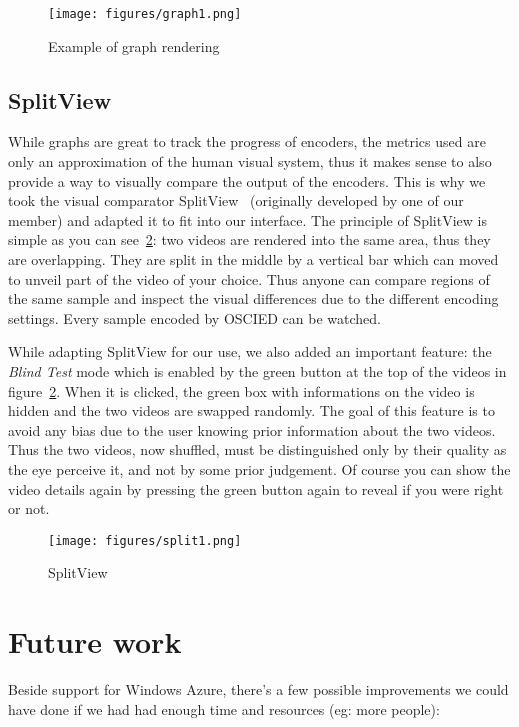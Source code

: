 \documentclass[a4paper,12pt]{article}
\begin{document}
\begin{figure}[!h] \centering
  \texttt{[image: figures/graph1.png]}
  \caption{Example of graph rendering}
  \label{fig:graph1}
\end{figure}

\subsection{SplitView}
While graphs are great to track the progress of encoders, the metrics used are
only an approximation of the human visual system, thus it makes sense to also
provide a way to visually compare the output of the encoders.
This is why we took the visual comparator SplitView~\cite{splitview}
(originally developed by one of our member) and adapted it to fit into our
interface.  The principle of SplitView is simple as you can
see~\ref{fig:split1}: two videos are rendered into the same area, thus they are
overlapping.  They are split in the middle by a vertical bar which can moved to
unveil part of the video of your choice.  Thus anyone can compare regions of the
same sample and inspect the visual differences due to the different encoding
settings. Every sample encoded by OSCIED can be watched.

While adapting SplitView for our use, we also added an important feature: the
\emph{Blind Test} mode which is enabled by the green button at the top of the
videos in figure~\ref{fig:split1}.  When it is clicked, the green box with
informations on the video is hidden and the two videos are swapped randomly. The goal
of this feature is to avoid any bias due to the user knowing prior information
about the two videos.  Thus the two videos, now shuffled, must be distinguished
only by their quality as the eye perceive it, and not by some prior judgement.
Of course you can show the video details again by pressing the green button
again to reveal if you were right or not.

\begin{figure}[!h] \centering
  \texttt{[image: figures/split1.png]}
  \caption{SplitView}
  \label{fig:split1}
\end{figure}

\section{Future work}
Beside support for Windows Azure, there's a few possible improvements we could
have done if we had had enough time and resources (eg: more people):
\end{document}
